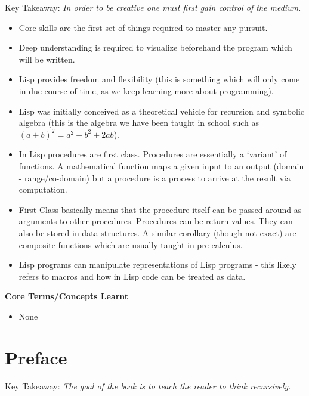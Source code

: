 \documentclass[11pt]{article}
\begin{document}
\vspace{1em}

Key Takeaway:
\emph{In order to be creative one must first gain control of the medium.}

\vspace{1em}

\begin{itemize}
\item Core skills are the first set of things required to master any pursuit.
\item Deep understanding is required to visualize beforehand the program which will be written.
\item Lisp provides freedom and flexibility (this is something which will only come in due course of time, as we keep
learning more about programming).
\item Lisp was initially conceived as a theoretical vehicle for recursion and symbolic algebra (this is the algebra we
have been taught in school such as \((a + b)^2 = a^2 + b^2 + 2ab\)).
\item In Lisp procedures are first class. Procedures are essentially a `variant' of functions. A mathematical function
maps a given input to an output (domain - range/co-domain) but a procedure is a process to arrive at the result via
computation.
\item First Class basically means that the procedure itself can be passed around as arguments to other procedures.
Procedures can be return values. They can also be stored in data structures. A similar corollary (though not exact)
are composite functions which are usually taught in pre-calculus.
\item Lisp programs can manipulate representations of Lisp programs - this likely refers to macros and how in Lisp code
can be treated as data.
\end{itemize}

\vspace{1em}

\textbf{Core Terms/Concepts Learnt}
\begin{itemize}
\item None
\end{itemize}

\newpage
\section{Preface}
\label{sec:org1802b9d}

Key Takeaway:
\emph{The goal of the book is to teach the reader to think recursively.}
\end{document}

